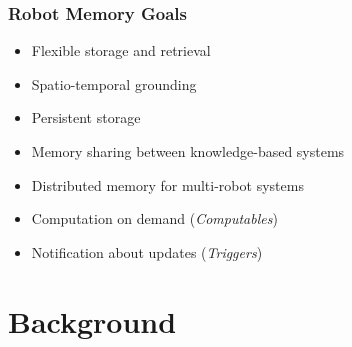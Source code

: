 \begin{frame}
  \frametitle{Robot Memory Goals}
  \begin{itemize}
  \item Flexible storage and retrieval %
  \item Spatio-temporal grounding
  \item Persistent storage
  \bigskip
  \item Memory sharing between knowledge-based systems
  \item Distributed memory for multi-robot systems
  \bigskip
  \item Computation on demand (\emph{Computables})
  \item Notification about updates (\emph{Triggers})
  \end{itemize}
\end{frame}


\section{Background}
\begin{frame}[plain]
  \tableofcontents[currentsection]
\end{frame}
\addtocounter{framenumber}{-1}

